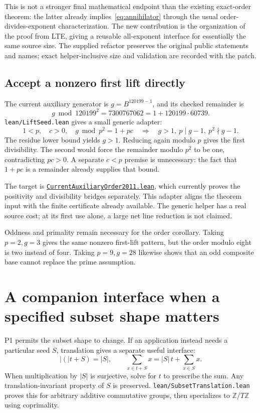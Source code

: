 \documentclass[11pt,letterpaper]{article}
\newcommand{\Z}{\mathbb Z}
\newcommand{\Zm}[1]{\Z/#1\Z}
\newcommand{\card}[1]{\lvert #1\rvert}
\newcommand{\repobase}{https://github.com/VladimirReshetnikov/ProveIt/blob/9f35798db4a63c25e435fca14d75931144657d7e}
\newcommand{\leanfile}[1]{\href{\repobase/Computability/DiophantineConsistency/Lean/DiophantineConsistency/#1.lean}{\nolinkurl{#1.lean}}}
\newcommand{\artifact}[1]{\nolinkurl{#1}}
\begin{document}
This is not a stronger final mathematical endpoint than the existing
exact-order theorem: the latter already implies~\eqref{eq:annihilator}
through the usual order-divides-exponent characterization. The new
contribution is the organization of the proof from LTE, giving a reusable
all-exponent interface for essentially the same source size. The supplied
refactor preserves the original public statements and names; exact
helper-inclusive size and validation are recorded with the patch.

\subsection{Accept a nonzero first lift directly}

The current auxiliary generator is $g=B^{120199-1}$, and its checked
remainder is
\[
 g\bmod120199^2=7300767062=1+120199\cdot60739.
\]
\artifact{lean/LiftSeed.lean} gives a small generic adapter:
\[
 1<p,\quad c>0,\quad g\bmod p^2=1+pc
 \quad\Longrightarrow\quad
 g>1,\ p\mid g-1,\ p^2\nmid g-1.
\]
The residue lower bound yields $g>1$. Reducing again modulo $p$ gives
the first divisibility. The second would force the remainder modulo $p^2$
to be one, contradicting $pc>0$. A separate $c<p$ premise is unnecessary:
the fact that $1+pc$ is a remainder already supplies that bound.

The target is \leanfile{CurrentAuxiliaryOrder2011}, which currently proves
the positivity and divisibility bridges separately. This adapter aligns
the theorem input with the finite certificate already available. The
generic helper has a real source cost; at its first use alone, a large net
line reduction is not claimed.

Oddness and primality remain necessary for the order corollary. Taking
$p=2,g=3$ gives the same nonzero first-lift pattern, but the order modulo
eight is two instead of four. Taking $p=9,g=28$ likewise shows that an odd
composite base cannot replace the prime assumption.

\section{A companion interface when a specified subset shape matters}

P1 permits the subset shape to change. If an application instead needs a
particular seed $S$, translation gives a separate useful interface:
\[
 \card(t+S)=\card S,\qquad
 \sum_{x\in t+S}x=\card S\,t+\sum_{x\in S}x.
\]
When multiplication by $\card S$ is surjective, solve for $t$ to prescribe
the sum. Any translation-invariant property of $S$ is preserved.
\artifact{lean/SubsetTranslation.lean} proves this for arbitrary additive
commutative groups, then specializes to $\Zm T$ using coprimality.
\end{document}
